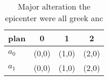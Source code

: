 \documentclass[a4paper]{article}
\begin{document}
\begin{table}
\begin{adjustbox}{width=0.6\columnwidth}
\begin{tabular}{|l|l|l|l|}
\hline
\textbf{plan} & \multicolumn{1}{c|}{\textbf{0}} & \multicolumn{1}{c|}{\textbf{1}} & \multicolumn{1}{c|}{\textbf{2}} \\ \hline
\textbf{$a_0$}  & (0,0) & (1,0) & (2,0) \\ \hline
\textbf{$a_1$}  & (0,0) & (1,0) & (2,0) \\ \hline
\end{tabular}
\end{adjustbox}
\caption{Major alteration the epicenter were all greek anc
}
\end{table}
\end{document}
